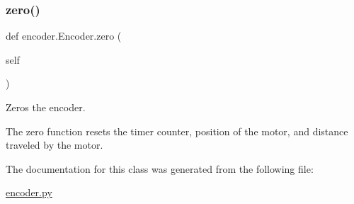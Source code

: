 \subsubsection{\texorpdfstring{zero()}{zero()}}
{\footnotesize\ttfamily def encoder.\+Encoder.\+zero (\begin{DoxyParamCaption}\item[{}]{self }\end{DoxyParamCaption})}



Zeros the encoder. 

The zero function resets the timer counter, position of the motor, and distance traveled by the motor. 

The documentation for this class was generated from the following file\+:\begin{DoxyCompactItemize}
\item 
\mbox{\hyperlink{encoder_8py}{encoder.\+py}}\end{DoxyCompactItemize}
